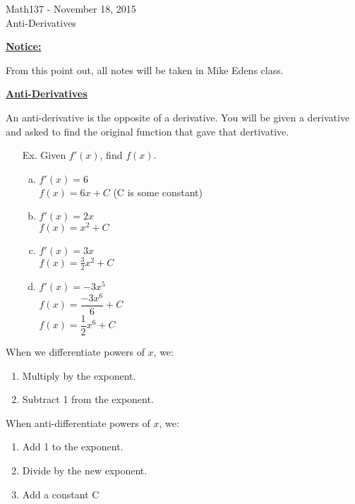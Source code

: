 \documentclass{letter}
\begin{document}
	\begin{center}
		\LARGE Math137 - November 18, 2015\\
		\large Anti-Derivatives
	\end{center}
	\vspace{0.25 in}
	\underline{\textbf{Notice:}}
	
	From this point out, all notes will be taken in Mike Edens class.
	
	\underline{\textbf{Anti-Derivatives}}
	
	An anti-derivative is the opposite of a derivative. You will be given  a derivative and asked to find the original function that gave that dertivative.
	
	\begin{itemize}
		\item[Ex. ] Given $f'(x)$, find $f(x)$.
		\begin{enumerate}[a)]
			\item $f'(x) = 6$\\
			$f(x) = 6x + C$ (C is some constant)\\
			\item $f'(x) = 2x$\\
			$f(x) = x^2 + C$\\
			\item $f'(x) = 3x$\\
			$f(x) = \frac{3}{2}x^2 + C$\\
			\item $f'(x) = -3x^5$\\
			$f(x) = \dfrac{-3x^6}{6} + C$\\
			$f(x) = \dfrac{1}{2}x^6 + C$\\
		\end{enumerate}
	\end{itemize}
	
	When we differentiate powers of $x$, we:
	\begin{enumerate}[1)]
		\item Multiply by the exponent.
		\item Subtract 1 from the exponent.
	\end{enumerate}
	When anti-differentiate powers of $x$, we:
	\begin{enumerate}[1)]
		\item Add 1 to the exponent.
		\item Divide by the new exponent.
		\item Add a constant C
	\end{enumerate}
\end{document}
